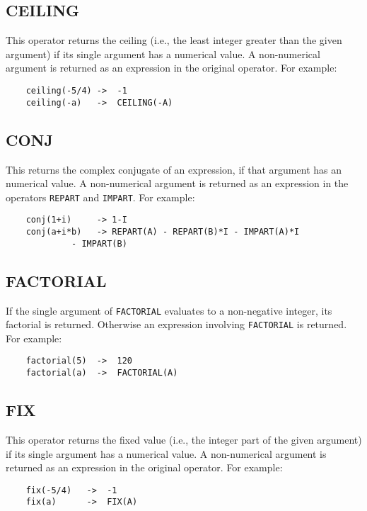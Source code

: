 \subsection{CEILING}
This operator returns the ceiling (i.e., the least integer greater than
the given argument) if its single argument has a numerical value.  A
non-numerical argument is returned as an expression in the original
operator.  For example:

\begin{verbatim}
	ceiling(-5/4) ->  -1
	ceiling(-a)   ->  CEILING(-A)
\end{verbatim}

\subsection{CONJ}
This returns the complex conjugate
of an expression, if that argument has an numerical value.  A
non-numerical argument is returned as an expression in the operators
{\tt REPART} and {\tt IMPART}. For example:
\begin{verbatim}
	conj(1+i)     -> 1-I
	conj(a+i*b)   -> REPART(A) - REPART(B)*I - IMPART(A)*I
			 - IMPART(B)
\end{verbatim}

\subsection{FACTORIAL}

If the single argument of {\tt FACTORIAL} evaluates to a non-negative
integer, its factorial is returned.  Otherwise an expression involving
{\tt FACTORIAL} is returned. For example:
\begin{verbatim}
	factorial(5)  ->  120
	factorial(a)  ->  FACTORIAL(A)
\end{verbatim}

\subsection{FIX}
This operator returns the fixed value (i.e., the integer part of
the given argument) if its single argument has a numerical value.  A
non-numerical argument is returned as an expression in the original
operator.  For example:

\begin{verbatim}
	fix(-5/4)   ->  -1
	fix(a)      ->  FIX(A)
\end{verbatim}

